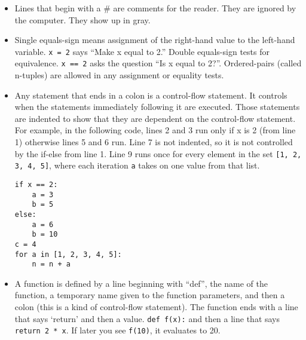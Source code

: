 \begin{itemize}
\item Lines that begin with a \# are comments for the reader. They are ignored by the computer. They show up in gray.
\item Single equals-sign means assignment of the right-hand value to the left-hand variable. \texttt{x = 2} says ``Make x equal to 2.'' Double equals-sign tests for equivalence. \texttt{x == 2} asks the question ``Is x equal to 2?''. Ordered-pairs (called n-tuples) are allowed in any assignment or equality tests.
\item Any statement that ends in a colon is a control-flow statement. It controls when the statements immediately following it are executed. Those statements are indented to show that they are dependent on the control-flow statement. For example, in the following code, lines 2 and 3 run only if x is 2 (from line 1) otherwise lines 5 and 6 run. Line 7 is not indented, so it is not controlled by the if-else from line 1. Line 9 runs once for every element in the set \texttt{[1, 2, 3, 4, 5]}, where each iteration \texttt{a} takes on one value from that list.

\begin{verbatim}
if x == 2:
    a = 3
    b = 5
else:
    a = 6
    b = 10
c = 4
for a in [1, 2, 3, 4, 5]:
    n = n + a
\end{verbatim}

\item A function is defined by a line beginning with ``def'', the name of the function, a temporary name given to the function parameters, and then a colon (this is a kind of control-flow statement). The function ends with a line that says `return' and then a value. \texttt{def f(x):} and then a line that says \texttt{return 2 * x}. If later you see \texttt{f(10)}, it evaluates to 20.

\end{itemize}

